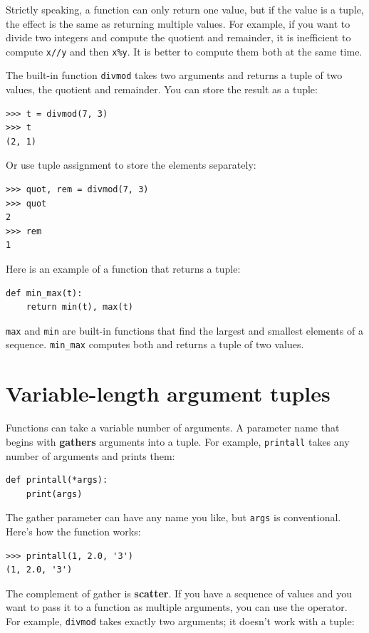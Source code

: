 \documentclass[10pt]{book}
\begin{document}
Strictly speaking, a function can only return one value, but
if the value is a tuple, the effect is the same as returning
multiple values.  For example, if you want to divide two integers
and compute the quotient and remainder, it is inefficient to
compute {\tt x//y} and then {\tt x\%y}.  It is better to compute
them both at the same time.

The built-in function {\tt divmod} takes two arguments and
returns a tuple of two values, the quotient and remainder.
You can store the result as a tuple:

\begin{verbatim}
>>> t = divmod(7, 3)
>>> t
(2, 1)
\end{verbatim}
%
Or use tuple assignment to store the elements separately:

\begin{verbatim}
>>> quot, rem = divmod(7, 3)
>>> quot
2
>>> rem
1
\end{verbatim}
%
Here is an example of a function that returns a tuple:

\begin{verbatim}
def min_max(t):
    return min(t), max(t)
\end{verbatim}
%
{\tt max} and {\tt min} are built-in functions that find
the largest and smallest elements of a sequence.  \verb"min_max"
computes both and returns a tuple of two values.


\section{Variable-length argument tuples}
\label{gather}

Functions can take a variable number of arguments.  A parameter
name that begins with {\tt *} {\bf gathers} arguments into
a tuple.  For example, {\tt printall}
takes any number of arguments and prints them:

\begin{verbatim}
def printall(*args):
    print(args)
\end{verbatim}
%
The gather parameter can have any name you like, but {\tt args} is
conventional.  Here's how the function works:

\begin{verbatim}
>>> printall(1, 2.0, '3')
(1, 2.0, '3')
\end{verbatim}
%
The complement of gather is {\bf scatter}.  If you have a
sequence of values and you want to pass it to a function
as multiple arguments, you can use the {\tt *} operator.
For example, {\tt divmod} takes exactly two arguments; it
doesn't work with a tuple:
\end{document}
